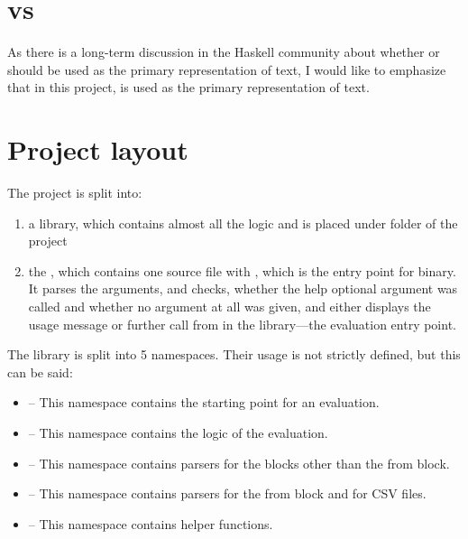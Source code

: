 \section{ vs }
As there is a long-term discussion in the Haskell community about whether  or  should be used as the 
primary representation of text, I would like to emphasize that in this project,  is used as the primary
representation of text.

\section{Project layout}

The project is split into:
\begin{enumerate}
  \item a library, which contains almost all the logic and is placed under
        folder of the project

  \item the , which contains one source file
      with , which is the entry point for  binary. 
      It parses the arguments, and checks, whether the help optional argument was called and whether no argument at all was given, 
     and either displays the usage message or further call  from  in the library---the evaluation entry point.
\end{enumerate}

The library is split into 5 namespaces. Their usage is not strictly defined, but this can be said:
\begin{itemize}
    \item {} -- This namespace contains the starting point for an  evaluation.
    \item {} -- This namespace contains the logic of the evaluation.
    \item {} -- This namespace contains parsers for the blocks other than the from block.
    \item {} -- This namespace contains parsers for the from block and for CSV files.
    \item {} -- This namespace contains helper functions.
\end{itemize}


